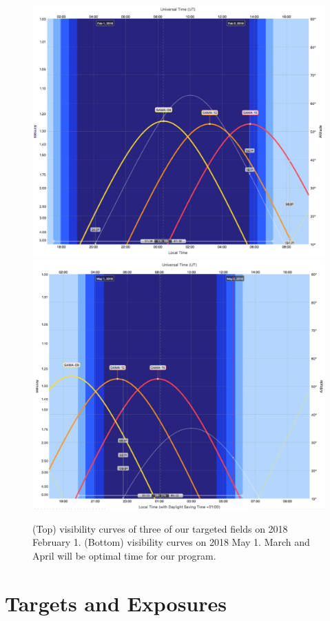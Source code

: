 \documentclass[letterpaper,12pt]{article}
\begin{document}
\begin{figure}[hbt]
\includegraphics[width=5in]{visibility/visibility_feb.pdf}
\includegraphics[width=5in]{visibility/visibility_may.pdf}
\caption{
(Top) visibility curves of three of our targeted fields on 2018 February 1. (Bottom) visibility curves on 2018
May 1. March and April will be optimal time for our program.}
\end{figure}

\clearpage

\section{Targets and Exposures}
\end{document}

